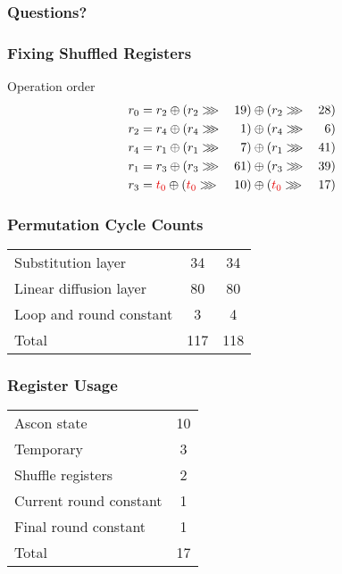 \documentclass[17pt]{beamer}
\newcommand{\xor}[0]{\oplus}
\newcommand{\ror}[0]{\ggg}
\newcommand{\red}[1]{\textcolor[rgb]{0.9,0.0,0.0}{#1}}
\begin{document}
\begin{frame}
    \frametitle{Questions?}
\end{frame}

\begin{frame}[t]
    \frametitle{Fixing Shuffled Registers}
    Operation order
    \begin{alignat*}{3}
        r_0 & = r_2 \xor (r_2 \ror \: & 19) & \xor (r_2 \ror \: & 28) \\
        r_2 & = r_4 \xor (r_4 \ror \: &  1) & \xor (r_4 \ror \: &  6) \\
        r_4 & = r_1 \xor (r_1 \ror \: &  7) & \xor (r_1 \ror \: & 41) \\
        r_1 & = r_3 \xor (r_3 \ror \: & 61) & \xor (r_3 \ror \: & 39) \\
        r_3 & = \red{t_0} \xor (\red{t_0} \ror \: & 10) & \xor (\red{t_0} \ror \: & 17) \\
    \end{alignat*}
\end{frame}

\begin{frame}
    \frametitle{Permutation Cycle Counts}
    \begin{center}
        \begin{tabular}{l c c}
            Substitution layer & 34 & 34 \\
            Linear diffusion layer & 80 & 80 \\
            Loop and round constant & 3 & 4 \\ \hline
            Total & 117 & 118
        \end{tabular}
    \end{center}
\end{frame}

\begin{frame}
    \frametitle{Register Usage}
    \begin{center}
        \begin{tabular}{l c}
            Ascon state & 10 \\
            Temporary & 3 \\
            Shuffle registers & 2 \\
            Current round constant & 1 \\
            Final round constant & 1 \\ \hline
            Total & 17
        \end{tabular}
    \end{center}
\end{frame}
\end{document}
